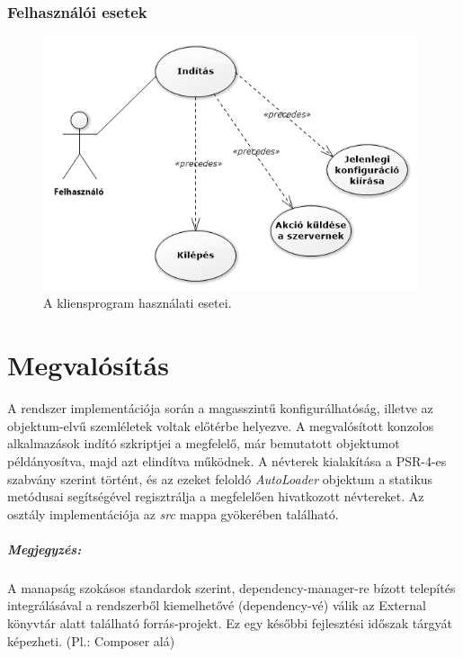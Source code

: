 \documentclass[12pt]{report}
\begin{document}
\subsubsection{Felhasználói esetek}
   \begin{figure}[ht]
       \centering
         \includegraphics[width=11cm]{pics/cluc.png}
	  \caption{A kliensprogram használati esetei.}
  \end{figure}
  

\section{Megvalósítás}
A rendszer implementációja során a magasszintű konfigurálhatóság, illetve az objektum-elvű szemléletek voltak előtérbe helyezve. A megvalósított konzolos alkalmazások indító szkriptjei a megfelelő, már bemutatott objektumot példányosítva, majd azt elindítva működnek. A névterek kialakítása a PSR-4-es szabvány szerint történt, és az ezeket feloldó \textit{AutoLoader} objektum a statikus metódusai segítségével regisztrálja a megfelelően hivatkozott névtereket. Az osztály implementációja az \textit{src} mappa gyökerében található.
\subparagraph{Megjegyzés:} A manapság szokásos standardok szerint, dependency-manager-re bízott telepítés integrálásával a rendszerből kiemelhetővé (dependency-vé) válik az External könyvtár alatt található forrás-projekt. Ez egy későbbi fejlesztési időszak tárgyát képezheti. (Pl.: Composer alá)
\end{document}
